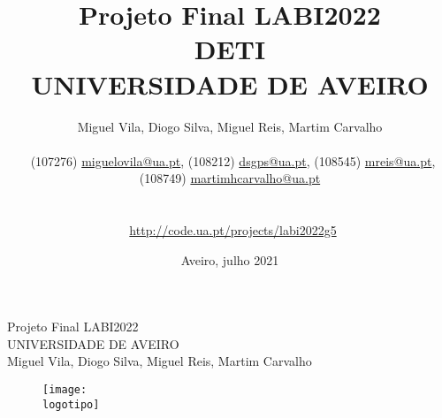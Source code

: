 \documentclass{report}
\begin{document}
\def\titulo{Projeto Final LABI2022}
\def\data{Aveiro, julho 2021}
\def\autores{Miguel Vila, Diogo Silva, Miguel Reis, Martim Carvalho}
\def\autorescontactos{(107276) \href{mailto:miguelovila@ua.pt}{miguelovila@ua.pt}, (108212) \href{mailto:dsgps@ua.pt}{dsgps@ua.pt}, (108545) \href{mailto:mreis@ua.pt}{mreis@ua.pt}, (108749) \href{mailto:martimhcarvalho@ua.pt}{martimhcarvalho@ua.pt}}
\def\projetocodeua{\url{http://code.ua.pt/projects/labi2022g5}}
\def\departamento{DETI}
\def\empresa{UNIVERSIDADE DE AVEIRO}
\def\logotipo{ua.pdf}

\begin{titlepage}
\begin{center}
\vspace*{20mm}
{\Huge \titulo}\\ 
\vspace{10mm}
{\Large \empresa}\\
\vspace{10mm}
{\LARGE \autores}\\ 
\vspace{30mm}
\begin{figure}[h]
\center
\texttt{[image: \\logotipo]}
\end{figure}
\vspace{20mm}
\end{center}
\begin{flushright}
\end{flushright}
\end{titlepage}

\title{%
{\Huge\textbf{\titulo}}\\
{\Large \departamento\\ \empresa}
}
\author{
    \autores\\\\\
    \autorescontactos\\\\\\\
    \projetocodeua\\
}
\date{\data}
\maketitle
{}
\end{document}
